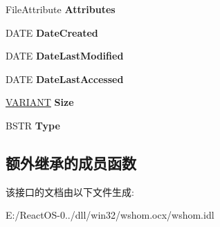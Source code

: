 \begin{DoxyCompactItemize}
File\+Attribute {\bfseries Attributes}
\item 
\mbox{\label{interface_i_wsh_runtime_library_1_1_i_file_a421236723359ee9135f3e789f8ab01b1}} 
D\+A\+TE {\bfseries Date\+Created}
\item 
\mbox{\label{interface_i_wsh_runtime_library_1_1_i_file_a40a98dde7db2842714f87d77a58341d5}} 
D\+A\+TE {\bfseries Date\+Last\+Modified}
\item 
\mbox{\label{interface_i_wsh_runtime_library_1_1_i_file_ae37bcfd57b88f97fe6199a22cba633fa}} 
D\+A\+TE {\bfseries Date\+Last\+Accessed}
\item 
\mbox{\label{interface_i_wsh_runtime_library_1_1_i_file_a39ed5b6caaad288973f4ff365a2b1973}} 
\hyperlink{structtag_v_a_r_i_a_n_t}{V\+A\+R\+I\+A\+NT} {\bfseries Size}
\item 
\mbox{\label{interface_i_wsh_runtime_library_1_1_i_file_a2bbacc74b31b2340c79ca0d5c8178896}} 
B\+S\+TR {\bfseries Type}
\end{DoxyCompactItemize}
\subsection*{额外继承的成员函数}


该接口的文档由以下文件生成\+:\begin{DoxyCompactItemize}
\item 
E\+:/\+React\+O\+S-\/0../dll/win32/wshom.\+ocx/wshom.\+idl\end{DoxyCompactItemize}
